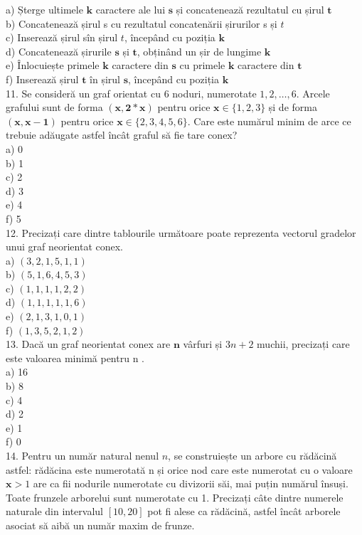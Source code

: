 a) Șterge ultimele $\mathbf{k}$ caractere ale lui $\mathbf{s}$ și concatenează rezultatul cu șirul $\mathbf{t}$\\
b) Concatenează șirul s cu rezultatul concatenării șirurilor s și $t$\\
c) Inserează șirul sîn șirul $t$, începând cu poziția $\mathbf{k}$\\
d) Concatenează șirurile $\mathbf{s}$ și $\mathbf{t}$, obținând un șir de lungime $\mathbf{k}$\\
e) Înlocuiește primele $\mathbf{k}$ caractere din $\mathbf{s}$ cu primele $\mathbf{k}$ caractere din $\mathbf{t}$\\
f) Inserează șirul $\mathbf{t}$ în șirul $\mathbf{s}$, începând cu poziția $\mathbf{k}$\\
11. Se consideră un graf orientat cu 6 noduri, numerotate $1,2, \ldots, 6$. Arcele grafului sunt de forma $(\mathbf{x}, \mathbf{2 *} \mathbf{x})$ pentru orice $\mathbf{x} \in\{1,2,3\}$ și de forma $(\mathbf{x}, \mathbf{x}-\mathbf{1})$ pentru orice $\mathbf{x} \in\{2,3,4,5,6\}$. Care este numărul minim de arce ce trebuie adăugate astfel încât graful să fie tare conex?\\
a) 0\\
b) 1\\
c) 2\\
d) 3\\
e) 4\\
f) 5\\
12. Precizați care dintre tablourile următoare poate reprezenta vectorul gradelor unui graf neorientat conex.\\
a) $(3,2,1,5,1,1)$\\
b) $(5,1,6,4,5,3)$\\
c) $(1,1,1,1,2,2)$\\
d) $(1,1,1,1,1,6)$\\
e) $(2,1,3,1,0,1)$\\
f) $(1,3,5,2,1,2)$\\
13. Dacă un graf neorientat conex are $\mathbf{n}$ vârfuri și $3 n+2$ muchii, precizați care este valoarea minimă pentru n .\\
a) 16\\
b) 8\\
c) 4\\
d) 2\\
e) 1\\
f) 0\\
14. Pentru un număr natural nenul $n$, se construiește un arbore cu rădăcină astfel: rădăcina este numerotată n și orice nod care este numerotat cu o valoare $\mathbf{x}>1$ are ca fii nodurile numerotate cu divizorii săi, mai puțin numărul însuși. Toate frunzele arborelui sunt numerotate cu 1. Precizați câte dintre numerele naturale din intervalul $[10,20]$ pot fi alese ca rădăcină, astfel încât arborele asociat să aibă un număr maxim de frunze.\\
